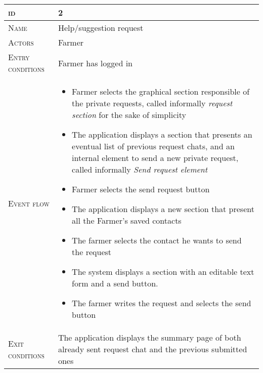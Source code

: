 \begin{table}[H]
    \centering
    \begin{tabular}{|l|p{}|}
        \hline %
    	\textsc{id}                 &   2\\
    	\hline %
    	\textsc{Name}               &   Help/suggestion request\\
    	\hline %
    	\textsc{Actors}             &   Farmer\\
    	\hline %
    	\textsc{Entry conditions}   &   Farmer has logged in\\
    	\hline %
    	\textsc{Event flow}         &   \footnotesize
            	                        \begin{itemize}
                                    	    \item Farmer selects the graphical section responsible of the private requests, called informally \textit{request section} for the sake of simplicity
                                    		\item The application displays a section that presents an eventual list of previous request chats, and an internal element to send a new private request, called informally \textit{Send request element}
                                    		\item Farmer selects the send request button
                                    		\item The application displays a new section that present all the Farmer's saved contacts
                                    		\item The farmer selects the contact he wants to send the request
                                    		\item The system displays a section with an editable text form and a send button.
                                    		\item The farmer writes the request and selects the send button
                                        \end{itemize}\\
        \hline %
        \textsc{Exit conditions}    &  The application displays the summary page of both already sent request chat and the previous submitted ones\\

\end{tabular}
\end{table}
